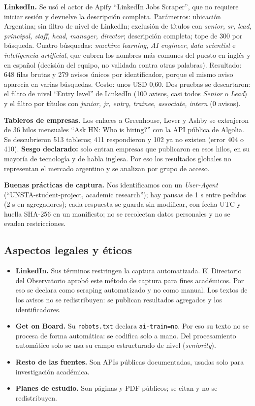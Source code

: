 \documentclass[11pt,a4paper]{article}
\begin{document}
\textbf{LinkedIn.} Se usó el actor de Apify ``LinkedIn Jobs Scraper'', que no requiere iniciar sesión y devuelve la descripción completa. Parámetros: ubicación Argentina; sin filtro de nivel de LinkedIn; exclusión de títulos con \emph{senior, sr, lead, principal, staff, head, manager, director}; descripción completa; tope de 300 por búsqueda. Cuatro búsquedas: \emph{machine learning}, \emph{AI engineer}, \emph{data scientist} e \emph{inteligencia artificial}, que cubren los nombres más comunes del puesto en inglés y en español (decisión del equipo, no validada contra otras palabras). Resultado: 648 filas brutas y 279 avisos únicos por identificador, porque el mismo aviso aparecía en varias búsquedas. Costo: unos USD 0,60. Dos pruebas se descartaron: el filtro de nivel ``Entry level'' de LinkedIn (100 avisos, casi todos \emph{Senior} o \emph{Lead}) y el filtro por títulos con \emph{junior, jr, entry, trainee, associate, intern} (0 avisos).

\textbf{Tableros de empresas.} Los enlaces a Greenhouse, Lever y Ashby se extrajeron de 36 hilos mensuales ``Ask HN: Who is hiring?'' con la API pública de Algolia. Se descubrieron 513 tableros; 411 respondieron y 102 ya no existen (error 404 o 410). \textbf{Sesgo declarado:} solo entran empresas que publicaron en esos hilos, en su mayoría de tecnología y de habla inglesa. Por eso los resultados globales no representan el mercado argentino y se analizan por grupo de acceso.

\textbf{Buenas prácticas de captura.} Nos identificamos con un \emph{User-Agent} (``UNSTA-student-project, academic research''); hay pausas de 1 s entre pedidos (2 s en agregadores); cada respuesta se guarda sin modificar, con fecha UTC y huella SHA-256 en un manifiesto; no se recolectan datos personales y no se evaden restricciones.

\subsection{Aspectos legales y éticos}\label{sec:legal}
\begin{itemize}
\item \textbf{LinkedIn.} Sus términos restringen la captura automatizada. El Directorio del Observatorio aprobó este método de captura para fines académicos. Por eso se declara como scraping automatizado y no como manual. Los textos de los avisos no se redistribuyen: se publican resultados agregados y los identificadores.
\item \textbf{Get on Board.} Su \texttt{robots.txt} declara \texttt{ai-train=no}. Por eso su texto no se procesa de forma automática: se codifica solo a mano. Del procesamiento automático solo se usa su campo estructurado de nivel (\emph{seniority}).
\item \textbf{Resto de las fuentes.} Son APIs públicas documentadas, usadas solo para investigación académica.
\item \textbf{Planes de estudio.} Son páginas y PDF públicos; se citan y no se redistribuyen.
\end{itemize}
\end{document}

